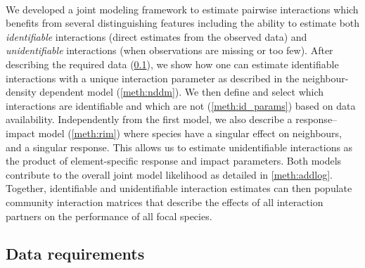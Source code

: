 \documentclass[a4,12pt]{article}
\begin{document}
\begin{refsection}
\paragraph{} 
We developed a joint modeling framework to estimate pairwise interactions which benefits from several distinguishing features including the ability to estimate both \textit{identifiable} interactions (direct estimates from the observed data) and \textit{unidentifiable} interactions (when observations are missing or too few). After describing the required data (\ref{meth:data}), we show how one can estimate identifiable interactions with a unique interaction parameter as described in the neighbour-density dependent model (\ref{meth:nddm}). We then define and select which interactions are identifiable and which are not (\ref{meth:id_params}) based on data availability. Independently from the first model, we also describe a response--impact model (\ref{meth:rim}) where species have a singular effect on neighbours, and a singular response. This allows us to estimate unidentifiable interactions as the product of element-specific response and impact parameters. Both models contribute to the overall joint model likelihood as detailed in \ref{meth:addlog}. Together, identifiable and unidentifiable interaction estimates can then  populate community interaction matrices that describe the effects of all interaction partners on the performance of all focal species. 




    \subsection{Data requirements}
    \label{meth:data}


\end{refsection}
\end{document}
